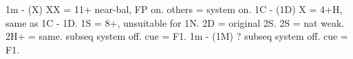 1m - (X)
    XX = 11+ near-bal, FP on. others = system on.
1C - (1D)
    X = 4+H, same as 1C - 1D. 1S = 8+, unsuitable for 1N.
    2D = original 2S. 2S = nat weak. 2H+ = same.
    subseq system off. cue = F1.
1m - (1M)
    ?
    subseq system off. cue = F1.
